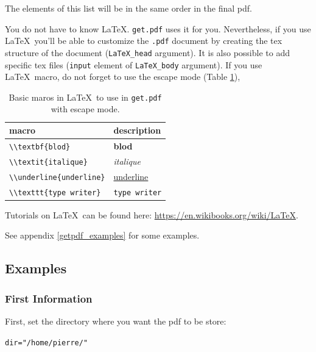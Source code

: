 \documentclass{article}\usepackage[]{graphicx}\usepackage[]{color}
\makeatletter
\newcommand{\hlstr}[1]{\textcolor[rgb]{0.192,0.494,0.8}{#1}}%
\newcommand{\hlstd}[1]{\textcolor[rgb]{0.345,0.345,0.345}{#1}}%
\newcommand{\hlkwb}[1]{\textcolor[rgb]{0.69,0.353,0.396}{#1}}%
\newenvironment{kframe}{%
 \def\at@end@of@kframe{}%
 \ifinner\ifhmode%
  \def\at@end@of@kframe{\end{minipage}}%
  \begin{minipage}{\columnwidth}%
 \fi\fi%
 \def\FrameCommand##1{\hskip\@totalleftmargin \hskip-\fboxsep
 \colorbox{shadecolor}{##1}\hskip-\fboxsep
     \hskip-\linewidth \hskip-\@totalleftmargin \hskip\columnwidth}%
 \MakeFramed {\advance\hsize-\width
   \@totalleftmargin\z@ \linewidth\hsize
   \@setminipage}}%
 {\par\unskip\endMakeFramed%
 \at@end@of@kframe}
\newenvironment{knitrout}{}{} %
\makeatother
\begin{document}
\begin{itemize}
\begin{itemize}
\end{itemize}


The elements of this list will be in the same order in the final pdf.

You do not have to know \LaTeX. \texttt{get.pdf} uses it for you.
Nevertheless, if you use \LaTeX~you'll be able to customize the \texttt{.pdf} document by creating the tex structure of the document (\texttt{LaTeX\_head} argument).
It is also possible to add specific tex files (\texttt{input} element of \texttt{LaTeX\_body} argument).
If you use \LaTeX~macro, do not forget to use the escape mode (Table \ref{macros}),

\begin{table}[H]
\begin{center}
\begin{tabular}{ll}
\hline
macro & description \\
\hline
\verb|\\textbf{blod}| & \textbf{blod} \\
\hline
\verb|\\textit{italique}| & \textit{italique} \\
\hline
\verb|\\underline{underline}| & \underline{underline} \\
\hline
\verb|\\texttt{type writer}| & \texttt{type writer} \\
\hline
\end{tabular}
\caption{Basic maros in \LaTeX~to use in \texttt{get.pdf} with escape mode.}
\label{macros}
\end{center}
\end{table}


Tutorials on \LaTeX~can be found here: \url{https://en.wikibooks.org/wiki/LaTeX}.

See appendix \ref{getpdf_examples} for some examples.

\subsection{Examples}

\subsubsection{First Information}
First, set the directory where you want the pdf to be store:
\begin{knitrout}
\color{fgcolor}\begin{kframe}
\begin{alltt}
\hlstd{dir} \hlkwb{=} \hlstr{"/home/pierre/"}
\end{alltt}
\end{kframe}
\end{knitrout}


\end{itemize}
\end{document}
